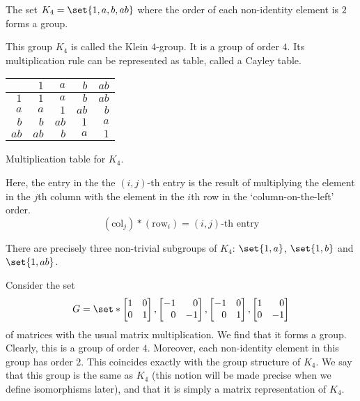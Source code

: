 \documentclass[11pt]{penrose}
\newcommand{\keyword}[1]{\textsf{#1}}
\begin{document}
\begin{nthm}
    The set $K_4 = \set{1, a, b, ab}$ where the order of each non-identity element is $2$ forms a group.
\end{nthm}

This group $K_4$ is called the \keyword{Klein $4$-group}. It is a group of order $4$. Its multiplication rule can be represented as table, called a Cayley table.
\begin{center}
    \begin{tabularx}{0.3\textwidth}{|R||R|R|R|R|}
        \hline
             & $ 1$ & $ a$ & $ b$ & $ab$ \\ \hline\hline
        $ 1$ & $ 1$ & $ a$ & $ b$ & $ab$ \\ \hline
        $ a$ & $ a$ & $ 1$ & $ab$ & $ b$ \\ \hline
        $ b$ & $ b$ & $ab$ & $ 1$ & $ a$ \\ \hline
        $ab$ & $ab$ & $ b$ & $ a$ & $ 1$ \\ \hline
    \end{tabularx}

    {Multiplication table for $K_4$.}
\end{center}

Here, the entry in the the $(i,j)$-th entry is the result of multiplying the element in the $j$th column with the element in the $i$th row in the `column-on-the-left' order.
\begin{equation*}
    (\text{col}_j) * (\text{row}_i) = (i,j)\text{-th entry}
\end{equation*}

There are precisely three non-trivial subgroups of $K_4$: $\set{1, a}$, $\set{1, b}$ and $\set{1, ab}$.

Consider the set
\begin{equation*}
    G = \set*{
    \begin{bmatrix*}[r]1 & 0\\ 0 & 1\end{bmatrix*},
    \begin{bmatrix*}[r]-1 & 0\\ 0 &-1\end{bmatrix*},
    \begin{bmatrix*}[r]-1 & 0\\0 & 1\end{bmatrix*},
    \begin{bmatrix*}[r]1 & 0\\0 & -1\end{bmatrix*} }
\end{equation*}
of matrices with the usual matrix multiplication. We find that it forms a group. Clearly, this is a group of order $4$. Moreover, each non-identity element in this group has order $2$. This coincides exactly with the group structure of $K_4$. We say that this group is the same as $K_4$ (this notion will be made precise when we define \keyword{isomorphisms} later), and that it is simply a matrix \keyword{representation} of $K_4$.
\end{document}
